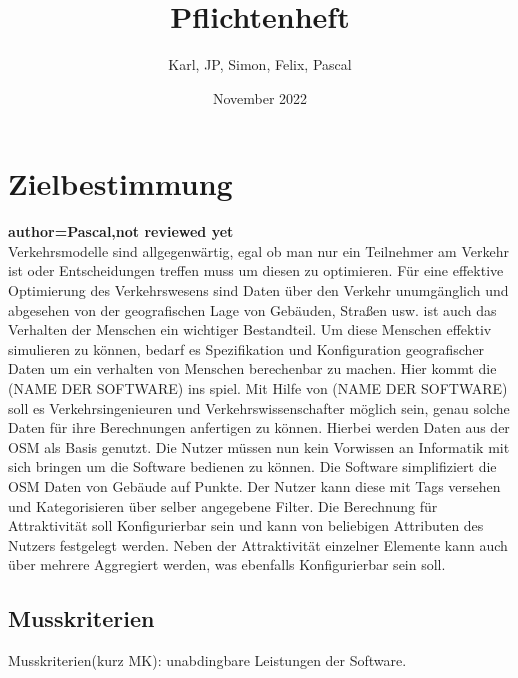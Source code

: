 \documentclass[parskip=full]{scrartcl} %
\title{Pflichtenheft}
\author{Karl, JP, Simon, Felix, Pascal}
\date{November 2022}
\begin{document}
\maketitle
\newpage

\tableofcontents
\newpage




\section{Zielbestimmung}

\textbf{author=Pascal,not reviewed yet\\}
Verkehrsmodelle sind allgegenwärtig, egal ob man nur ein Teilnehmer am Verkehr ist oder Entscheidungen treffen muss um diesen zu optimieren.
Für eine effektive Optimierung des Verkehrswesens sind Daten über den Verkehr unumgänglich und abgesehen von der geografischen Lage von Gebäuden, Straßen usw. ist auch das Verhalten der Menschen ein wichtiger Bestandteil.
Um diese Menschen effektiv simulieren zu können, bedarf es Spezifikation und Konfiguration geografischer Daten um ein verhalten von Menschen berechenbar zu machen.
Hier kommt die (NAME DER SOFTWARE) ins spiel.
Mit Hilfe von (NAME DER SOFTWARE) soll es  Verkehrsingenieuren und Verkehrswissenschafter möglich sein, genau solche Daten für ihre Berechnungen anfertigen zu können.
Hierbei werden Daten aus der OSM als Basis genutzt.
Die Nutzer müssen nun kein Vorwissen an Informatik mit sich bringen um die Software bedienen zu können.
Die Software simplifiziert die OSM Daten von Gebäude auf Punkte. Der Nutzer kann diese mit Tags versehen und Kategorisieren über selber angegebene Filter.
Die Berechnung für Attraktivität soll Konfigurierbar sein und kann von beliebigen Attributen des Nutzers festgelegt werden.
Neben der Attraktivität einzelner Elemente kann auch über mehrere Aggregiert werden, was ebenfalls Konfigurierbar sein soll.

\subsection{Musskriterien}
Musskriterien(kurz MK): unabdingbare Leistungen der Software.
\end{document}
